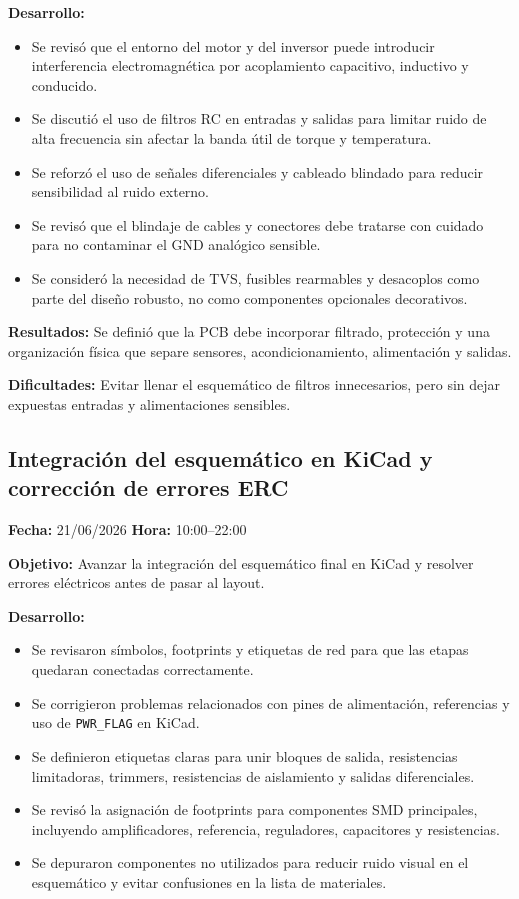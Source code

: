 \documentclass[12pt]{article}
\begin{document}
\textbf{Desarrollo:}
\begin{itemize}
\item Se revisó que el entorno del motor y del inversor puede introducir interferencia electromagnética por acoplamiento capacitivo, inductivo y conducido.
\item Se discutió el uso de filtros RC en entradas y salidas para limitar ruido de alta frecuencia sin afectar la banda útil de torque y temperatura.
\item Se reforzó el uso de señales diferenciales y cableado blindado para reducir sensibilidad al ruido externo.
\item Se revisó que el blindaje de cables y conectores debe tratarse con cuidado para no contaminar el GND analógico sensible.
\item Se consideró la necesidad de TVS, fusibles rearmables y desacoplos como parte del diseño robusto, no como componentes opcionales decorativos.
\end{itemize}

\textbf{Resultados:}
Se definió que la PCB debe incorporar filtrado, protección y una organización física que separe sensores, acondicionamiento, alimentación y salidas.

\textbf{Dificultades:}
Evitar llenar el esquemático de filtros innecesarios, pero sin dejar expuestas entradas y alimentaciones sensibles.

\subsection{Integración del esquemático en KiCad y corrección de errores ERC}
\textbf{Fecha:} 21/06/2026 \quad \textbf{Hora:} 10:00--22:00

\textbf{Objetivo:}
Avanzar la integración del esquemático final en KiCad y resolver errores eléctricos antes de pasar al layout.

\textbf{Desarrollo:}
\begin{itemize}
\item Se revisaron símbolos, footprints y etiquetas de red para que las etapas quedaran conectadas correctamente.
\item Se corrigieron problemas relacionados con pines de alimentación, referencias y uso de \texttt{PWR\_FLAG} en KiCad.
\item Se definieron etiquetas claras para unir bloques de salida, resistencias limitadoras, trimmers, resistencias de aislamiento y salidas diferenciales.
\item Se revisó la asignación de footprints para componentes SMD principales, incluyendo amplificadores, referencia, reguladores, capacitores y resistencias.
\item Se depuraron componentes no utilizados para reducir ruido visual en el esquemático y evitar confusiones en la lista de materiales.
\end{itemize}
\end{document}
